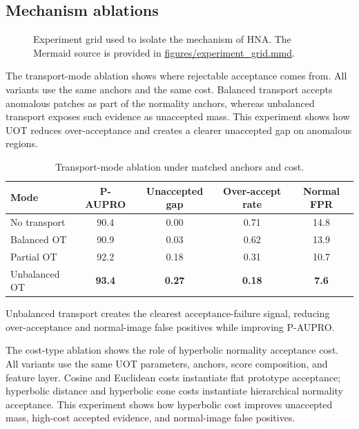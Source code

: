 \documentclass[10pt]{article}
\newcommand{\method}{HNA}
\begin{document}
\subsection{Mechanism ablations}

\begin{figure}[t]
\centering
{}
\caption{Experiment grid used to isolate the mechanism of \method{}. The Mermaid source is provided in \url{figures/experiment_grid.mmd}.}
\label{fig:experiment-grid}
\end{figure}

The transport-mode ablation shows where rejectable acceptance comes from.
All variants use the same anchors and the same cost.
Balanced transport accepts anomalous patches as part of the normality anchors, whereas unbalanced transport exposes such evidence as unaccepted mass.
This experiment shows how UOT reduces over-acceptance and creates a clearer unaccepted gap on anomalous regions.

\begin{table}[t]
\centering
\caption{Transport-mode ablation under matched anchors and cost.}
\label{tab:transport}
\begin{tabular}{lcccc}
\toprule
Mode & P-AUPRO & Unaccepted gap & Over-accept rate & Normal FPR \\
\midrule
No transport & 90.4 & 0.00 & 0.71 & 14.8 \\
Balanced OT & 90.9 & 0.03 & 0.62 & 13.9 \\
Partial OT & 92.2 & 0.18 & 0.31 & 10.7 \\
Unbalanced OT & \textbf{93.4} & \textbf{0.27} & \textbf{0.18} & \textbf{7.6} \\
\bottomrule
\end{tabular}
\end{table}

Unbalanced transport creates the clearest acceptance-failure signal, reducing over-acceptance and normal-image false positives while improving P-AUPRO.

The cost-type ablation shows the role of hyperbolic normality acceptance cost.
All variants use the same UOT parameters, anchors, score composition, and feature layer.
Cosine and Euclidean costs instantiate flat prototype acceptance; hyperbolic distance and hyperbolic cone costs instantiate hierarchical normality acceptance.
This experiment shows how hyperbolic cost improves unaccepted mass, high-cost accepted evidence, and normal-image false positives.
\end{document}
